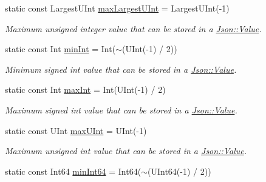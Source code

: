 \begin{DoxyCompactItemize}
\mbox{\label{classJson_1_1Value_a8ddb32d9d55fa5323ae5135639dc2e31}} 
static const Largest\+U\+Int \hyperlink{classJson_1_1Value_a8ddb32d9d55fa5323ae5135639dc2e31}{max\+Largest\+U\+Int} = Largest\+U\+Int(-\/1)
\begin{DoxyCompactList}\small\item\em Maximum unsigned integer value that can be stored in a \hyperlink{classJson_1_1Value}{Json\+::\+Value}. \end{DoxyCompactList}\item 
\mbox{\label{classJson_1_1Value_a7df8a39e2502b8c92a6a41e3d752d2c8}} 
static const Int \hyperlink{classJson_1_1Value_a7df8a39e2502b8c92a6a41e3d752d2c8}{min\+Int} = Int($\sim$(U\+Int(-\/1) / 2))
\begin{DoxyCompactList}\small\item\em Minimum signed int value that can be stored in a \hyperlink{classJson_1_1Value}{Json\+::\+Value}. \end{DoxyCompactList}\item 
\mbox{\label{classJson_1_1Value_a978c799a8af3114ef7dab6fd0a310a1b}} 
static const Int \hyperlink{classJson_1_1Value_a978c799a8af3114ef7dab6fd0a310a1b}{max\+Int} = Int(U\+Int(-\/1) / 2)
\begin{DoxyCompactList}\small\item\em Maximum signed int value that can be stored in a \hyperlink{classJson_1_1Value}{Json\+::\+Value}. \end{DoxyCompactList}\item 
\mbox{\label{classJson_1_1Value_ac79e63ee68d3aa914bfd6988be669b87}} 
static const U\+Int \hyperlink{classJson_1_1Value_ac79e63ee68d3aa914bfd6988be669b87}{max\+U\+Int} = U\+Int(-\/1)
\begin{DoxyCompactList}\small\item\em Maximum unsigned int value that can be stored in a \hyperlink{classJson_1_1Value}{Json\+::\+Value}. \end{DoxyCompactList}\item 
\mbox{\label{classJson_1_1Value_a815ef899bc312c93bc426511acfe31a7}} 
static const Int64 \hyperlink{classJson_1_1Value_a815ef899bc312c93bc426511acfe31a7}{min\+Int64} = Int64($\sim$(U\+Int64(-\/1) / 2))

\end{DoxyCompactItemize}
